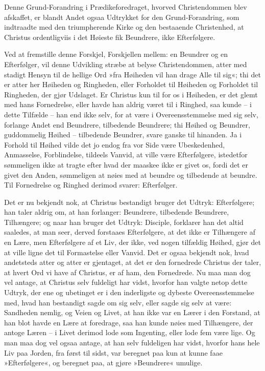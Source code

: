 \documentclass[12pt,a4paper]{article}
\begin{document}
Denne Grund-Forandring i Prædikeforedraget, hvorved Christendommen blev afskaffet, er blandt Andet ogsaa Udtrykket for den Grund-Forandring, som indtraadte med den triumpherende Kirke og den bestaaende Christenhed, at Christus ordentligviis i det Høieste fik Beundrere, ikke Efterfølgere.

Ved at fremstille denne Forskjel, Forskjellen mellem: en Beundrer og en Efterfølger, vil denne Udvikling stræbe at belyse Christendommen, atter med stadigt Hensyn til de hellige Ord »fra Høiheden vil han drage Alle til sig«; thi det er atter her Høiheden og Ringheden, eller Forholdet til Høiheden og Forholdet til Ringheden, der gjør Udslaget. Er Christus kun til for os i Høiheden, er det glemt med hans Fornedrelse, eller havde han aldrig været til i Ringhed, saa kunde – i dette Tilfælde – han end ikke selv, for at være i Overeensstemmelse med sig selv, forlange Andet end Beundrere, tilbedende Beundrere; thi Høihed og Beundrer, guddommelig Høihed – tilbedende Beundrer, svare ganske til hinanden. Ja i Forhold til Høihed vilde det jo endog fra vor Side være Ubeskedenhed, Anmasselse, Forblindelse, tildeels Vanvid, at ville være Efterfølgere, istedetfor sømmeligen ikke at tragte efter hvad der maaskee ikke er givet os, fordi det er givet den Anden, sømmeligen at nøies med at beundre og tilbedende at beundre. Til Fornedrelse og Ringhed derimod svarer: Efterfølger.

Det er nu bekjendt nok, at Christus bestandigt bruger det Udtryk: Efterfølgere; han taler aldrig om, at han forlanger: Beundrere, tilbedende Beundrere, Tilhængere; og naar han bruger det Udtryk: Disciple, forklarer han det altid saaledes, at man seer, derved forstaaes Efterfølgere, at det ikke er Tilhængere af en Lære, men Efterfølgere af et Liv, der ikke, ved nogen tilfældig Høihed, gjør det at ville ligne det til Formastelse eller Vanvid. Det er ogsaa bekjendt nok, hvad andetsteds atter og atter er gjentaget, at det er den fornedrede Christus der taler, at hvert Ord vi have af Christus, er af ham, den Fornedrede. Nu maa man dog vel antage, at Christus selv fuldeligt har vidst, hvorfor han valgte netop dette Udtryk, der ene og ubetinget er i den inderligste og dybeste Overeensstemmelse med, hvad han bestandigt sagde om sig selv, eller sagde sig selv at være: Sandheden nemlig, og Veien og Livet, at han ikke var en Lærer i den Forstand, at han blot havde en Lære at foredrage, saa han kunde nøies med Tilhængere, der antoge Læren – i Livet derimod lode som Ingenting, eller lode fem være lige. Og man maa dog vel ogsaa antage, at han selv fuldeligen har vidst, hvorfor hans hele Liv paa Jorden, fra først til sidst, var beregnet paa kun at kunne faae »Efterfølgere«, og beregnet paa, at gjøre »Beundrere« umulige.
\end{document}
